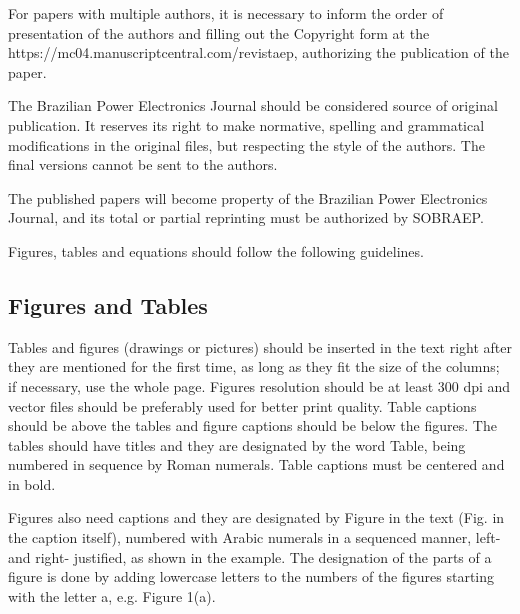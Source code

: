 \documentclass[english]{sobraep}
\begin{document}
For papers with multiple authors, it is necessary to inform the order of presentation of the authors and filling out the Copyright form at the https://mc04.manuscriptcentral.com/revistaep, authorizing the publication of the paper.

The Brazilian Power Electronics Journal should be considered source of original publication. It reserves its right to make normative, spelling and grammatical modifications in the original files, but respecting the style of the authors. The final versions cannot be sent to the authors.

The published papers will become property of the Brazilian Power Electronics Journal, and its total or partial reprinting must be authorized by SOBRAEP.

Figures, tables and equations should follow the following guidelines.

\subsection{Figures and Tables}

Tables and figures (drawings or pictures) should be inserted in the text right after they are mentioned for the first time, as long as they fit the size of the columns; if necessary, use the whole page. Figures resolution should be at least 300 dpi and vector files should be preferably used for better print quality. Table captions should be above the tables and figure captions should be below the figures. The tables should have titles and they are designated by the word Table, being numbered in sequence by Roman numerals. Table captions must be centered and in bold.

Figures also need captions and they are designated by Figure in the text (Fig. in the caption itself), numbered with Arabic numerals in a sequenced manner, left- and right- justified, as shown in the example. The designation of the parts of a figure is done by adding lowercase letters to the numbers of the figures starting with the letter a, e.g. Figure 1(a).
\end{document}
